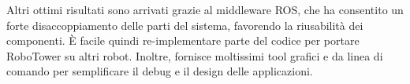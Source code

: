 
Altri ottimi risultati sono arrivati grazie al middleware ROS, che ha consentito un forte disaccoppiamento delle parti del sistema, favorendo la riusabilità dei componenti. È facile quindi re-implementare parte del codice per portare RoboTower su altri robot. Inoltre, fornisce  moltissimi tool grafici e da linea di comando per semplificare il debug e il design delle applicazioni. 

